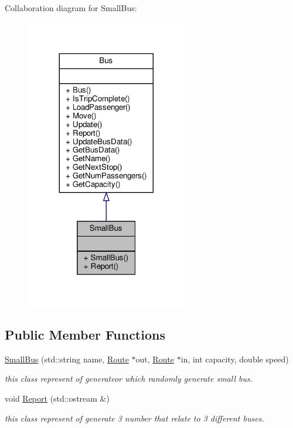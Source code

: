 Collaboration diagram for Small\+Bus\+:\nopagebreak
\begin{figure}[H]
\begin{center}
\leavevmode
\includegraphics[width=200pt]{classSmallBus__coll__graph}
\end{center}
\end{figure}
\subsection*{Public Member Functions}
\begin{DoxyCompactItemize}
\item 
\hyperlink{classSmallBus_ab92bbfb8a88c33ffeabc685a6857820c}{Small\+Bus} (std\+::string name, \hyperlink{classRoute}{Route} $\ast$out, \hyperlink{classRoute}{Route} $\ast$in, int capacity, double speed)
\begin{DoxyCompactList}\small\item\em this class represent of generateor which randomly generate small bus. \end{DoxyCompactList}\item 
void \hyperlink{classSmallBus_a989198babc9a180799de58b4f3dadb50}{Report} (std\+::ostream \&)
\begin{DoxyCompactList}\small\item\em this class represent of generate 3 number that relate to 3 different buses. \end{DoxyCompactList}\end{DoxyCompactItemize}


